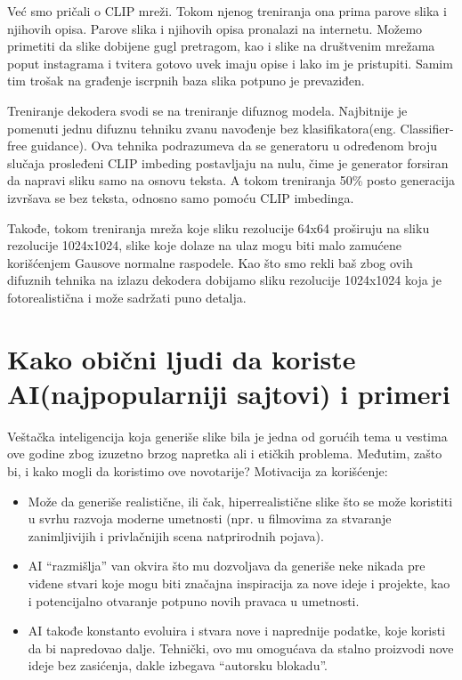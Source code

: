 \documentclass[12pt, letterpaper]{article}
\begin{document}
Već smo pričali o CLIP mreži. Tokom njenog treniranja ona prima parove slika i njihovih opisa. Parove slika i njihovih opisa pronalazi na internetu. Možemo primetiti da slike dobijene gugl pretragom, kao i slike na društvenim mrežama poput instagrama i tvitera gotovo uvek imaju opise i lako im je pristupiti. Samim tim trošak na građenje iscrpnih baza slika potpuno je prevaziđen.\cite{clip, openai_dali}

Treniranje dekodera svodi se na treniranje difuznog modela. Najbitnije je pomenuti jednu difuznu tehniku zvanu navođenje bez klasifikatora(eng. Classifier-free guidance). Ova tehnika podrazumeva da se generatoru u određenom broju slučaja prosleđeni CLIP imbeding postavljaju na nulu, čime je generator forsiran da napravi sliku samo na osnovu teksta. A tokom treniranja 50\% posto generacija izvršava se bez teksta, odnosno samo pomoću CLIP imbedinga.

Takođe, tokom treniranja mreža koje sliku rezolucije 64x64 proširuju na sliku rezolucije 1024x1024, slike koje dolaze na ulaz mogu biti malo zamućene korišćenjem Gausove normalne raspodele. Kao što smo rekli baš zbog ovih difuznih tehnika na izlazu dekodera dobijamo sliku rezolucije 1024x1024 koja je fotorealistična i može sadržati puno detalja.\cite{openai_dali}

\pagebreak

\section{Kako obični ljudi da koriste AI(najpopularniji sajtovi) i primeri}
Veštačka inteligencija koja generiše slike bila je jedna od gorućih tema u vestima ove godine zbog izuzetno brzog napretka ali i etičkih problema. Međutim, zašto bi, i kako mogli da koristimo ove novotarije?
Motivacija za korišćenje:
\begin{itemize}
  \item Može da generiše realistične, ili čak, hiperrealistične slike što se može koristiti u svrhu razvoja moderne umetnosti (npr. u filmovima za stvaranje zanimljivijih i privlačnijih scena natprirodnih pojava).
  \item AI “razmišlja” van okvira što mu dozvoljava da generiše neke nikada pre viđene stvari koje mogu biti značajna inspiracija za nove ideje i projekte, kao i potencijalno otvaranje potpuno novih pravaca u umetnosti.
  \item AI takođe konstanto evoluira i stvara nove i naprednije podatke, koje koristi da bi napredovao dalje. Tehnički, ovo mu omogućava da stalno proizvodi nove ideje bez zasićenja, dakle izbegava “autorsku blokadu”.
\end{itemize}
\end{document}
